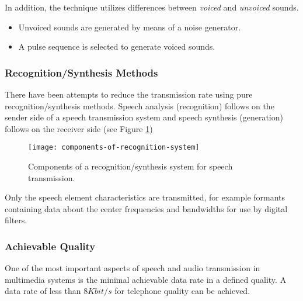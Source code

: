 In addition, the technique utilizes differences between \textit{voiced} and \textit{unvoiced} sounds. 
\begin{itemize}
	\item Unvoiced sounds are generated by means of a noise generator. 
	\item A pulse sequence is selected to generate voiced sounds.
\end{itemize}

\subsubsection*{Recognition/Synthesis Methods}


There have been attempts to reduce the transmission rate using pure recognition/synthesis methods. Speech analysis (recognition) follows on the sender side of a speech transmission system and speech synthesis (generation) follows on the receiver side (see Figure {\ref{fig:components-of-recognition-system}})

\begin{figure}[hb]
	\centering
		\texttt{[image: components-of-recognition-system]}
	\caption[Recognition/synthesis systems.]{Components of a recognition/synthesis system for speech transmission.}\label{fig:components-of-recognition-system}
\end{figure}


Only the speech element characteristics are transmitted, for example formants containing data about the center frequencies and bandwidths for use by digital filters.

\subsubsection*{Achievable Quality}
One of the most important aspects of speech and audio transmission in multimedia systems is the minimal achievable data rate in a defined quality. A data rate of less than $ 8Kbit/s $ for telephone quality can be achieved.

